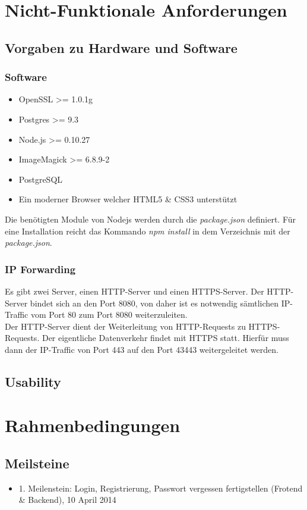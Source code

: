 \documentclass[a4paper,bibtotoc,oneside]{scrartcl}	%
\begin{document}
\section{Nicht-Funktionale Anforderungen}
	\subsection{Vorgaben zu Hardware und Software}
		\subsubsection{Software}
			\begin{itemize}
				\item OpenSSL >= 1.0.1g
				\item Postgres >= 9.3
				\item Node.js >= 0.10.27
				\item ImageMagick >= 6.8.9-2
				\item PostgreSQL
				\item Ein moderner Browser welcher HTML5 \& CSS3 unterstützt
			\end{itemize}
		
			\noindent Die benötigten Module von Nodejs werden durch die \textit{package.json} definiert.
			Für eine Installation reicht das Kommando \textit{npm install} in dem Verzeichnis mit
			der \textit{package.json}.
			
		\subsubsection{IP Forwarding}
			Es gibt zwei Server, einen HTTP-Server und einen HTTPS-Server. Der HTTP-Server bindet
			sich an den Port 8080, von daher ist es notwendig sämtlichen IP-Traffic vom Port 80
			zum Port 8080 weiterzuleiten.\\
			
			\noindent Der HTTP-Server dient der Weiterleitung von HTTP-Requests zu HTTPS-Requests.
			Der eigentliche Datenverkehr findet mit HTTPS statt. Hierfür muss dann der IP-Traffic
			von Port 443 auf den Port 43443 weitergeleitet werden.
	\subsection{Usability}

\section{Rahmenbedingungen}
\subsection{Meilsteine}
	\begin{itemize}
		\item 1. Meilenstein: Login, Registrierung, Passwort vergessen fertigstellen (Frotend \& Backend), 10 April 2014

	\end{itemize}
\end{document}
